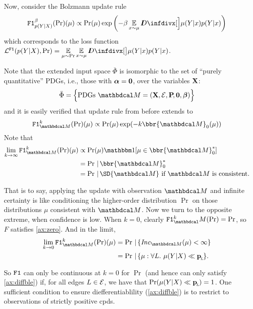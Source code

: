 \documentclass{article}
\begin{document}
Now, consider the Bolzmann update rule
\[
	\F_{p(Y|X)}^{\beta}(\Pr) (\mu) \propto \Pr(\mu) \exp
		\left(-\beta \Ex_{x \sim \mu} 
			\kldiv[\Big]{\mu(Y|x)}{p(Y|x)}
		\right)
\]
which corresponds to the loss function
$\mathcal L^{\F}(p(Y|X), \Pr) = \displaystyle \Ex_{\mu \sim \Pr}\Ex_{x \sim \mu} 
	\kldiv[\big]{\mu(Y|x)}{p(Y|x)}$.

Note that the extended input space $\bar \Phi$ is isomorphic to the set of ``purely quantitative'' PDGs, i.e., those with $\boldsymbol\alpha = \mathbf{0}$, over the variables $\mathbf{X}$: $$
	\bar\Phi = \Big\{ \text{PDGs}~\dg M = (\mat X, \Ed, \bP[], \mat0, \bbeta) \Big\}
$$
and it is easily verified that update rule from before extends to
\[
	\F_{\dg M}^k(\Pr)(\mu) \propto \Pr(\mu) \exp(- k \bbr{\dg M}_0(\mu))
\]
Note that
\begin{align*}
	\lim_{k \to \infty} \F_{\dg M}^k(\Pr)(\mu) &\propto
		\Pr(\mu) \mathbbm1[\mu \in {\bbr{\dg M}^*_0}] \\
		&= \Pr \,|\, \bbr{\dg M}^*_0 \\
		&= \Pr \,|\, \SD{\dg M} \text{~if $\dg M$ is consistent.}
\end{align*}

That is to say, applying the update with observation $\dg M$ and infinite certainty is like conditioning the higher-order distribution $\Pr$ on those distributions $\mu$ consistent with $\dg M$.
Now we turn to the opposite extreme, when confidence is low. When $k=0$, clearly $\F^k_\dg M(\Pr) = \Pr$, so $F$ satisfies \cref{ax:zero}. And in the limit,
\begin{align*}
	\lim_{k \to 0} \F_{\dg M}^k(\Pr)(\mu) &= \Pr \,|\, \{ \Inc_{\dg M}(\mu) < \infty \} \\
		&= \Pr \,|\, \{\mu : \forall L.~\mu(Y|X) \ll \bp \}.
\end{align*}

So $\mathtt{F1}$ can only be continuous at $k=0$ for $\Pr$ (and hence can only satisfy \cref{ax:diffble}) if, for all edges $L \in \mathcal E$, we have that $\Pr(\mu(Y|X) \ll \mathbf{p}_{\!_{L}\!}) = 1$.
One sufficient condition to ensure diefferentiablility (\cref{ax:diffble}) is to restrict to observations of strictly positive cpds.
\end{document}
